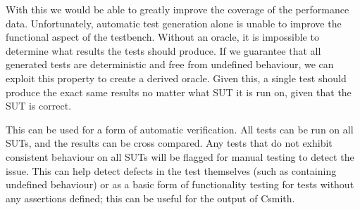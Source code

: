 With this we would be able to greatly improve the coverage of the performance data. Unfortunately, automatic test generation alone is unable to improve the functional aspect of the testbench. Without an oracle, it is impossible to determine what results the tests should produce. If we guarantee that all generated tests are deterministic and free from undefined behaviour, we can exploit this property to create a derived oracle. Given this, a single test should produce the exact same results no matter what SUT it is run on, given that the SUT is correct.

This can be used for a form of automatic verification. All tests can be run on all SUTs, and the results can be cross compared. Any tests that do not exhibit consistent behaviour on all SUTs will be flagged for manual testing to detect the issue. This can help detect defects in the test themselves (such as containing undefined behaviour) or as a basic form of functionality testing for tests without any assertions defined; this can be useful for the output of Csmith.